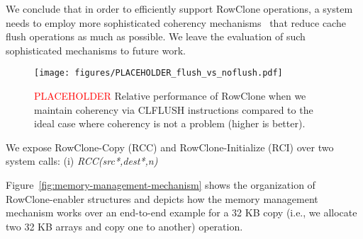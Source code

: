We conclude that in order to efficiently support RowClone operations, a system needs to employ more sophisticated coherency mechanisms~\cite{X,Y,Z} that reduce cache flush operations as much as possible. We leave the evaluation of such sophisticated mechanisms to future work.

\begin{figure*}[!th]
  \centering
  \texttt{[image: figures/PLACEHOLDER\_flush\_vs\_noflush.pdf]}
  \caption{\textcolor{red}{PLACEHOLDER} Relative performance of RowClone when we maintain coherency via CLFLUSH instructions compared to the ideal case where coherency is not a problem (higher is better).}
  \label{fig:flush_vs_noflush}
\end{figure*}
\fi






\iffalse
We expose RowClone-Copy (RCC) and RowClone-Initialize (RCI) over two system calls: (i) \emph{RCC(src*,dest*,n)}


Figure~\ref{fig:memory-management-mechanism} shows the organization of RowClone-enabler structures and depicts how the memory management mechanism works over an end-to-end example for a 32 KB copy (i.e., we allocate two 32 KB arrays and copy one to another) operation.



